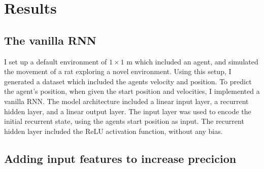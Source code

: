 \section{Results}\label{sec:results}
\subsection{The vanilla RNN}
I set up a default environment of $1 \times 1$ m which included an agent, and simulated the movement of a rat exploring a novel environment. Using this setup, I generated a dataset which included the agents velocity and position. To predict the agent's position, when given the start position and velocities, I implemented a vanilla RNN. The model architecture included a linear input layer, a recurrent hidden layer, and a linear output layer. The input layer was used to encode the initial recurrent state, using the agents start position as input. The recurrent hidden layer included the ReLU activation function, without any bias.




\subsection{Adding input features to increase precicion}
